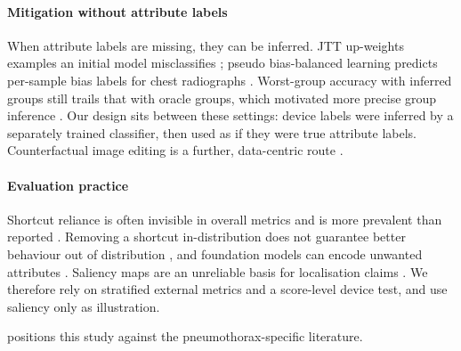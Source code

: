 \documentclass[final,3p]{elsarticle}
\begin{document}
\paragraph{Mitigation without attribute labels}
When attribute labels are missing, they can be inferred. JTT up-weights examples an initial model misclassifies \citep{liu2021jtt}; pseudo bias-balanced learning predicts per-sample bias labels for chest radiographs \citep{luo2022pbbl}. Worst-group accuracy with inferred groups still trails that with oracle groups, which motivated more precise group inference \citep{han2024gic}. Our design sits between these settings: device labels were inferred by a separately trained classifier, then used as if they were true attribute labels. Counterfactual image editing is a further, data-centric route \citep{cooke2026roentmod}.

\paragraph{Evaluation practice}
Shortcut reliance is often invisible in overall metrics and is more prevalent than reported \citep{unnikrishnan2024pest,vasquez2024cleverhans}. Removing a shortcut in-distribution does not guarantee better behaviour out of distribution \citep{yang2024limits}, and foundation models can encode unwanted attributes \citep{glocker2023foundation}. Saliency maps are an unreliable basis for localisation claims \citep{saporta2022saliency,arun2021saliency}. We therefore rely on stratified external metrics and a score-level device test, and use saliency only as illustration.

 positions this study against the pneumothorax-specific literature.
\end{document}
